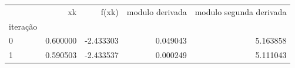 \begin{tabular}{lrrrr}
\toprule
 & xk & f(xk) & modulo derivada & modulo segunda derivada \\
iteração &  &  &  &  \\
\midrule
0 & 0.600000 & -2.433303 & 0.049043 & 5.163858 \\
1 & 0.590503 & -2.433537 & 0.000249 & 5.111043 \\
\bottomrule
\end{tabular}
